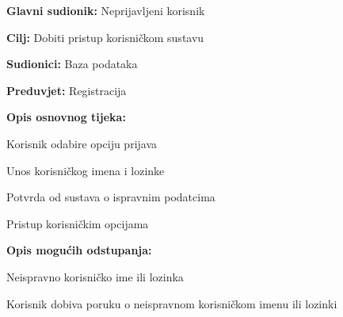 					
						\noindent {}
					\begin{packed_item}
						
						\item \textbf{Glavni sudionik: }Neprijavljeni korisnik
						\item  \textbf{Cilj:} Dobiti pristup korisničkom sustavu
						\item  \textbf{Sudionici:} Baza podataka
						\item  \textbf{Preduvjet:} Registracija
						\item  \textbf{Opis osnovnog tijeka:}
						
						\item[] \begin{packed_enum}
							
							\item Korisnik odabire opciju prijava
							\item Unos korisničkog imena i lozinke
							\item Potvrda od sustava o ispravnim podatcima
							\item Pristup korisničkim opcijama
						\end{packed_enum}
						
						\item  \textbf{Opis mogućih odstupanja:}
						
						\item[] \begin{packed_item}
							
							\item[3.a] Neispravno korisničko ime ili lozinka
							\item[] \begin{packed_enum}
								\item Korisnik dobiva poruku o neispravnom korisničkom imenu ili lozinki
							\end{packed_enum}
						
						\end{packed_item}
					\end{packed_item}
					
